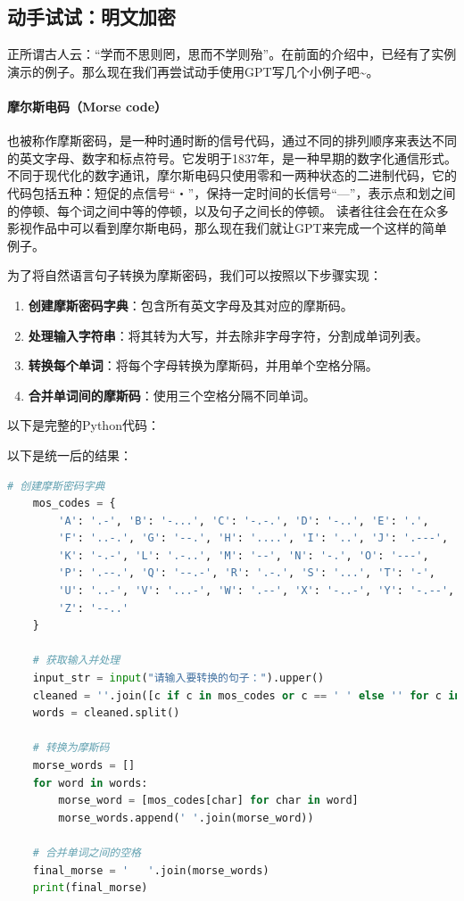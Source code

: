 \subsection{动手试试：明文加密}

正所谓古人云：``学而不思则罔，思而不学则殆''。在前面的介绍中，已经有了实例演示的例子。那么现在我们再尝试动手使用GPT写几个小例子吧\textasciitilde{}。

\paragraph{摩尔斯电码（Morse code）}也被称作摩斯密码，是一种时通时断的信号代码，通过不同的排列顺序来表达不同的英文字母、数字和标点符号。它发明于1837年，是一种早期的数字化通信形式。不同于现代化的数字通讯，摩尔斯电码只使用零和一两种状态的二进制代码，它的代码包括五种：短促的点信号``・''，保持一定时间的长信号``---''，表示点和划之间的停顿、每个词之间中等的停顿，以及句子之间长的停顿。
读者往往会在在众多影视作品中可以看到摩尔斯电码，那么现在我们就让GPT来完成一个这样的简单例子。


\begin{gptbox}
\footnotesize{为了将自然语言句子转换为摩斯密码，我们可以按照以下步骤实现：

\begin{enumerate}
  \def\labelenumi{\arabic{enumi}.}
  \item
        \textbf{创建摩斯密码字典}：包含所有英文字母及其对应的摩斯码。
  \item
        \textbf{处理输入字符串}：将其转为大写，并去除非字母字符，分割成单词列表。
  \item
        \textbf{转换每个单词}：将每个字母转换为摩斯码，并用单个空格分隔。
  \item
        \textbf{合并单词间的摩斯码}：使用三个空格分隔不同单词。
\end{enumerate}
以下是完整的Python代码：
}
\small{
以下是统一后的结果：
\begin{lstlisting}[language=Python]
    # 创建摩斯密码字典
    mos_codes = {
        'A': '.-', 'B': '-...', 'C': '-.-.', 'D': '-..', 'E': '.', 
        'F': '..-.', 'G': '--.', 'H': '....', 'I': '..', 'J': '.---', 
        'K': '-.-', 'L': '.-..', 'M': '--', 'N': '-.', 'O': '---', 
        'P': '.--.', 'Q': '--.-', 'R': '.-.', 'S': '...', 'T': '-', 
        'U': '..-', 'V': '...-', 'W': '.--', 'X': '-..-', 'Y': '-.--', 
        'Z': '--..'
    }
    
    # 获取输入并处理
    input_str = input("请输入要转换的句子：").upper()
    cleaned = ''.join([c if c in mos_codes or c == ' ' else '' for c in input_str])
    words = cleaned.split()
    
    # 转换为摩斯码
    morse_words = []
    for word in words:
        morse_word = [mos_codes[char] for char in word]
        morse_words.append(' '.join(morse_word))
    
    # 合并单词之间的空格
    final_morse = '   '.join(morse_words)
    print(final_morse)
\end{lstlisting}
}
\end{gptbox}

